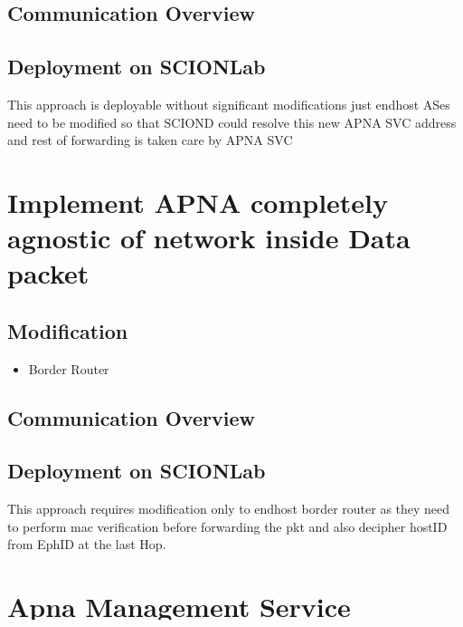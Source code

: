 \subsection{Communication Overview}

\subsection{Deployment on SCIONLab}
This approach is deployable without significant modifications just endhost ASes need to be modified so that SCIOND could resolve this new APNA SVC address and rest of forwarding is taken care by APNA SVC

\section{Implement APNA completely agnostic of network inside Data packet}
\subsection{Modification}
\begin{itemize}
\item Border Router
\end{itemize}

\subsection{Communication Overview}

\subsection{Deployment on SCIONLab}
This approach requires modification only to endhost border router as they need to perform mac verification before forwarding the pkt and also decipher hostID from EphID at the last Hop.

\section{Apna Management Service}

\subsection{Issue Ephemeral IDs}
\subsection{Mock DNS}
\subsection{Service to obtain pub key with which pkt was signed}
\subsection{Conversion between HostIDs and IP address}

\section{APNA Packet Description}

\section{}
